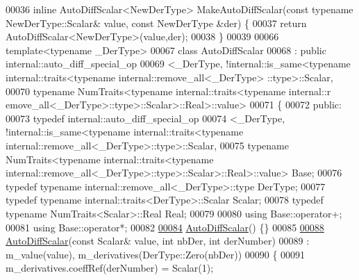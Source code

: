 \begin{DoxyCode}
00036 \textcolor{keyword}{inline} AutoDiffScalar<NewDerType> MakeAutoDiffScalar(\textcolor{keyword}{const} \textcolor{keyword}{typename} NewDerType::Scalar& value, \textcolor{keyword}{const} 
      NewDerType &der) \{
00037   \textcolor{keywordflow}{return} AutoDiffScalar<NewDerType>(value,der);
00038 \}
00039 
00066 \textcolor{keyword}{template}<\textcolor{keyword}{typename} \_DerType>
00067 \textcolor{keyword}{class }AutoDiffScalar
00068   : \textcolor{keyword}{public} internal::auto\_diff\_special\_op
00069             <\_DerType, !internal::is\_same<typename internal::traits<typename internal::remove\_all<\_DerType>
      ::type>::Scalar,
00070                                           typename NumTraits<typename internal::traits<typename internal::r
      emove\_all<\_DerType>::type>::Scalar>::Real>::value>
00071 \{
00072   \textcolor{keyword}{public}:
00073     \textcolor{keyword}{typedef} internal::auto\_diff\_special\_op
00074             <\_DerType, !internal::is\_same<typename internal::traits<typename
       internal::remove\_all<\_DerType>::type>::Scalar,
00075                        \textcolor{keyword}{typename} NumTraits<typename internal::traits<typename
       internal::remove\_all<\_DerType>::type>::Scalar>::Real>::value> Base;
00076     \textcolor{keyword}{typedef} \textcolor{keyword}{typename} internal::remove\_all<\_DerType>::type DerType;
00077     \textcolor{keyword}{typedef} \textcolor{keyword}{typename} internal::traits<DerType>::Scalar Scalar;
00078     \textcolor{keyword}{typedef} \textcolor{keyword}{typename} NumTraits<Scalar>::Real Real;
00079 
00080     \textcolor{keyword}{using} Base::operator+;
00081     \textcolor{keyword}{using} Base::operator*;
00082 
\hyperlink{class_eigen_1_1_auto_diff_scalar_ae73d362745e986c00cee5658bf731412}{00084}     \hyperlink{class_eigen_1_1_auto_diff_scalar_ae73d362745e986c00cee5658bf731412}{AutoDiffScalar}() \{\}
00085 
\hyperlink{class_eigen_1_1_auto_diff_scalar_a7f4f44f682ba5d500c34c4f2fa6ecb9e}{00088}     \hyperlink{class_eigen_1_1_auto_diff_scalar_a7f4f44f682ba5d500c34c4f2fa6ecb9e}{AutoDiffScalar}(\textcolor{keyword}{const} Scalar& value, \textcolor{keywordtype}{int} nbDer, \textcolor{keywordtype}{int} derNumber)
00089       : m\_value(value), m\_derivatives(DerType::Zero(nbDer))
00090     \{
00091       m\_derivatives.coeffRef(derNumber) = Scalar(1);

\end{DoxyCode}
